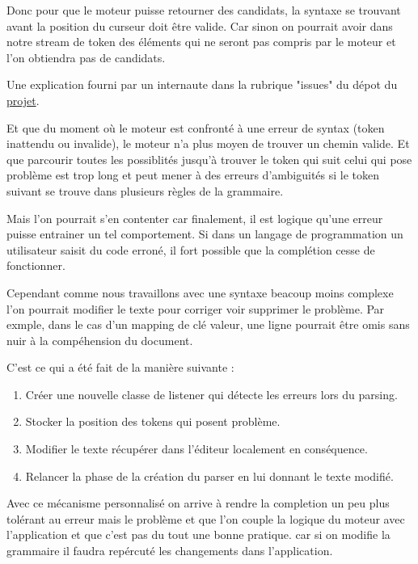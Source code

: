 \documentclass[
    iict, %
    il, %
]{heig-tb}
\begin{document}
Donc pour que le moteur puisse retourner des candidats, la syntaxe se trouvant avant la position du curseur doit être valide.
Car sinon on pourrait avoir dans notre stream de token des éléments qui ne seront pas compris par le moteur et l'on obtiendra pas de candidats.

Une explication fourni par un internaute dans la rubrique "issues" du dépot du \href{ https://github.com/mike-lischke/antlr4-c3/issues/29}{projet}.

Et que du moment où le moteur est confronté à une erreur de syntax (token inattendu ou invalide), le moteur n'a plus moyen de trouver un chemin valide.
Et que parcourir toutes les possiblités jusqu'à trouver le token qui suit celui qui pose problème est trop long et peut mener à des erreurs d'ambiguités si le token suivant se trouve dans plusieurs règles de la grammaire.

Mais l'on pourrait s'en contenter car finalement, il est logique qu'une erreur puisse entrainer un tel comportement.
Si dans un langage de programmation un utilisateur saisit du code erroné, il fort possible que la complétion cesse de fonctionner.



Cependant comme nous travaillons avec une syntaxe beacoup moins complexe l'on pourrait modifier le texte pour corriger voir supprimer le problème.
Par exmple, dans le cas d'un mapping de clé valeur, une ligne pourrait être omis sans nuir à la compéhension du document.

C'est ce qui a été fait de la manière suivante :
\begin{enumerate}
    \item Créer une nouvelle classe de listener qui détecte les erreurs lors du parsing.
    \item Stocker la position des tokens qui posent problème.
    \item Modifier le texte récupérer dans l'éditeur localement en conséquence.
    \item Relancer la phase de la création du parser en lui donnant le texte modifié.
\end{enumerate}

Avec ce mécanisme personnalisé on arrive à rendre la completion un peu plus tolérant au erreur mais le problème et que l'on couple la logique du moteur avec l'application et que c'est pas du tout une bonne pratique.
car si on modifie la grammaire il faudra repércuté les changements dans l'application.
\end{document}

